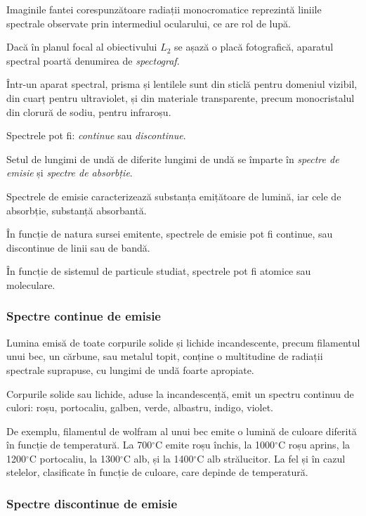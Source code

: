 Imaginile fantei corespunzătoare radiații monocromatice reprezintă liniile
spectrale observate prin intermediul ocularului, ce are rol de lupă.

Dacă în planul focal al obiectivului $L_2$ se așază o placă fotografică,
aparatul spectral poartă denumirea de \emph{spectograf}.

Într-un aparat spectral, prisma și lentilele sunt din sticlă pentru domeniul
vizibil, din cuarț pentru ultraviolet, și din materiale transparente, precum
monocristalul din clorură de sodiu, pentru infraroșu.

Spectrele pot fi: \emph{continue} sau \emph{discontinue}.

Setul de lungimi de undă de diferite lungimi de undă se împarte în
\emph{spectre de emisie} și \emph{spectre de absorbție}.

Spectrele de emisie caracterizează substanța emițătoare de lumină, iar cele de
absorbție, substanță absorbantă.

În funcție de natura sursei emitente, spectrele de emisie pot fi continue, sau discontinue de linii sau de bandă.

În funcție de sistemul de particule studiat, spectrele pot fi atomice sau moleculare.

\subsubsection{Spectre continue de emisie}

Lumina emisă de toate corpurile solide și lichide incandescente, precum
filamentul unui bec, un cărbune, sau metalul topit, conține o multitudine de
radiații spectrale suprapuse, cu lungimi de undă foarte apropiate.

Corpurile solide sau lichide, aduse la incandescență, emit un spectru continuu de culori: roșu, portocaliu, galben, verde, albastru, indigo, violet.

De exemplu, filamentul de wolfram al unui bec emite o lumină de culoare
diferită în funcție de temperatură. La 700$^\circ$C emite roșu închis, la
1000$^\circ$C roșu aprins, la 1200$^\circ$C portocaliu, la 1300$^\circ$C alb,
și la 1400$^\circ$C alb strălucitor. La fel și în cazul stelelor, clasificate
în funcție de culoare, care depinde de temperatură.

\subsubsection{Spectre discontinue de emisie}

